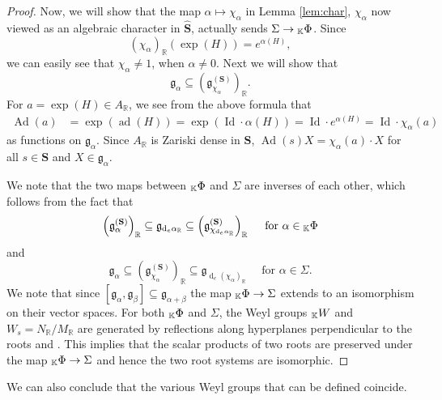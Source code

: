 \documentclass[12pt]{amsart}
\newcommand{\R}{\mathbb{R} }
\newcommand{\K}{\mathbb{K}}
\newcommand{\frakg}{\mathfrak{g}}
\newcommand{\bS}{\mathbf{S}}
\newcommand{\KPhi}{\vphantom{\Phi}_{\K}\Phi}
\newcommand{\KW}{\vphantom{W}_{\K}W}
\numberwithin{equation}{section}
\theoremstyle{remark} %
\begin{document}
\begin{proof}
   Now, we will show that the map $\alpha \mapsto \chi_\alpha$ in Lemma \ref{lem:char}, $\chi_\alpha$ now viewed as an algebraic character in $\hat{\bS}$, actually sends $\Sigma \to \KPhi$. Since
   $$
   (\chi_\alpha)_\R(\exp(H)) = e^{\alpha(H)},
   $$
   we can easily see that $\chi_\alpha \neq 1$, when $\alpha \neq 0$. Next we will show that
   $$
   \frakg_\alpha \subseteq \left(\frakg_{\chi_\alpha}^{(\bS)} \right)_{\R}.
   $$ 
   For $a=\exp(H) \in A_{\R}$, we see from the above formula that
   \begin{align*}
   	\operatorname{Ad}(a) & = \exp(\operatorname{ad}(H)) = \exp( \operatorname{Id} \cdot \alpha(H) ) 
   	= \operatorname{Id} \cdot e^{\alpha(H)} = \operatorname{Id} \cdot \chi_\alpha(a) 
   \end{align*}
   as functions on $\frakg_\alpha$. Since $A_{\R}$ is Zariski dense in $\bS$, $\operatorname{Ad}(s) X = \chi_\alpha (a) \cdot X$ for all $s \in \bS$ and $X \in \frakg_{\alpha}$.
   
   We note that the two maps between $\KPhi$ and $\Sigma$ are inverses of each other, which follows from the fact that
   $$
   \left(\frakg_{\alpha}^{(\bS)}\right)_{\R} \subseteq \frakg_{\operatorname{d}_e\!\alpha_{\R}} \subseteq 
   \left(\frakg_{\chi_{\operatorname{d}_e\!\alpha_\R}}^{(\bS)}\right)_{\R} \quad \text{ for } \alpha \in \KPhi
   $$
   and 
   $$
   \frakg_\alpha \subseteq \left(\frakg_{\chi_\alpha}^{(\bS)}\right)_{\R} \subseteq \frakg_{\operatorname{d}_e\!(\chi_{\alpha})_{\R}} \quad \text{ for } \alpha \in \Sigma. 
   $$
   We note that since $[\frakg_{\alpha},\frakg_\beta] \subseteq \frakg_{\alpha + \beta}$ the map $\KPhi \to \Sigma$ extends to an isomorphism on their vector spaces. For both $\KPhi$ and $\Sigma$, the Weyl groups $\KW$ and $W_s=N_{\R}/M_{\R}$ are generated by reflections along hyperplanes perpendicular to the roots \cite[Theorem 21.2]{Bor} and \cite[Proposition 7.32]{Kna}. This implies that the scalar products of two roots are preserved under the map $\KPhi \to \Sigma$ and hence the two root systems are isomorphic.
\end{proof}

We can also conclude that the various Weyl groups that can be defined coincide.
\end{document}
